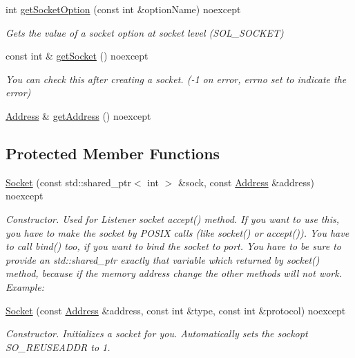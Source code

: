 \begin{DoxyCompactItemize}
int \hyperlink{classtnnf_1_1_socket_ac74f6279385ca8ba99fe1e3abad3a5c5}{get\+Socket\+Option} (const int \&option\+Name) noexcept
\begin{DoxyCompactList}\small\item\em Gets the value of a socket option at socket level (S\+O\+L\+\_\+\+S\+O\+C\+K\+E\+T) \end{DoxyCompactList}\item 
const int \& \hyperlink{classtnnf_1_1_socket_a335fc92da4c521466f7a3b6b8d148677}{get\+Socket} () noexcept
\begin{DoxyCompactList}\small\item\em You can check this after creating a socket. (-\/1 on error, errno set to indicate the error) \end{DoxyCompactList}\item 
\hyperlink{classtnnf_1_1_address}{Address} \& \hyperlink{classtnnf_1_1_socket_ae9cf2601ad28cb33907aaf739bb242f4}{get\+Address} () noexcept
\end{DoxyCompactItemize}
\subsection*{Protected Member Functions}
\begin{DoxyCompactItemize}
\item 
\hyperlink{classtnnf_1_1_socket_aedef0ea78f717a350a33f0783ec34f74}{Socket} (const std\+::shared\+\_\+ptr$<$ int $>$ \&sock, const \hyperlink{classtnnf_1_1_address}{Address} \&address) noexcept
\begin{DoxyCompactList}\small\item\em Constructor. Used for Listener socket accept() method. If you want to use this, you have to make the socket by P\+O\+S\+I\+X calls (like socket() or accept()). You have to call bind() too, if you want to bind the socket to port. You have to be sure to provide an std\+::shared\+\_\+ptr exactly that variable which returned by socket() method, because if the memory address change the other methods will not work. Example\+: \end{DoxyCompactList}\item 
\hyperlink{classtnnf_1_1_socket_a206066f59699ed689dbfdd662e7cc5c0}{Socket} (const \hyperlink{classtnnf_1_1_address}{Address} \&address, const int \&type, const int \&protocol) noexcept
\begin{DoxyCompactList}\small\item\em Constructor. Initializes a socket for you. Automatically sets the sockopt S\+O\+\_\+\+R\+E\+U\+S\+E\+A\+D\+D\+R to 1. \end{DoxyCompactList}\end{DoxyCompactItemize}
